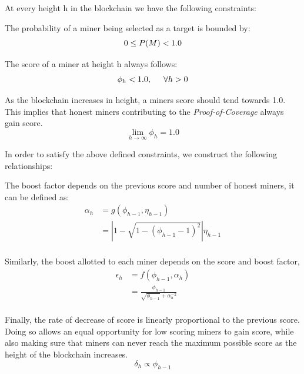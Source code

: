 \documentclass[10pt, nonatbib, nocopyrightspace, reprint]{sigplanconf}
\begin{document}
At every height h in the blockchain we have the following constraints:

The probability of a miner being selected as a target is bounded by:
\begin{equation*} \label{constraint1}
0 \leq P(M) < 1.0 \\
\end{equation*}

The score of a miner at height h always follows:
\begin{equation*} \label{constraint2}
\phi_h < 1.0, \hspace{0.5cm} \forall h > 0
\end{equation*}

As the blockchain increases in height, a miners score should tend towards 1.0. This implies that honest miners contributing to the \emph{Proof-of-Coverage} always gain score.
\begin{equation*} \label{goal}
\lim_{h \to \infty} \phi_h = 1.0
\end{equation*}

In order to satisfy the above defined constraints, we construct the following relationships:

The boost factor depends on the previous score and number of honest miners, it can be defined as:
\begin{equation*} \label{alpha}
\begin{split}
    \alpha_h & = g(\phi_{h-1}, \eta_{h-1}) \\
    & = \left\lvert 1 - \sqrt{1 - {(\phi_{h-1} - 1)}^2} \right\rvert \eta_{h-1} \\
\end{split}
\end{equation*}

Similarly, the boost allotted to each miner depends on the score and boost factor,
\begin{equation*} \label{epsilon}
\begin{split}
    \epsilon_h & = f(\phi_{h-1}, \alpha_h) \\
    & = \frac{\phi_{h-1}}{\sqrt{\phi_{h-1}} + \alpha_h^{-2}}\\
\end{split}
\end{equation*}

Finally, the rate of decrease of score is linearly proportional to the previous score. Doing so allows an equal opportunity for low scoring miners to gain score, while also making sure that miners can never reach the maximum possible score as the height of the blockchain increases.
\begin{equation*} \label{delta}
\delta_h \propto \phi_{h-1}
\end{equation*}
\end{document}
